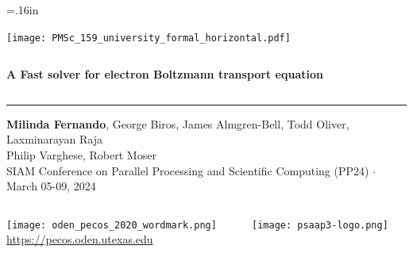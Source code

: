 \documentclass[mathserif, aspectratio=169]{beamer}
\begin{document}


\hoffset=.16in

\begin{frame}[plain,t]{}
\makeatletter
\texttt{[image: PMSc\_159\_university\_formal\_horizontal.pdf]} \newline
\begin{columns}[T,onlytextwidth]
{\bf \color{burntorange} \selectfont 
A Fast solver for electron Boltzmann transport equation
}
\end{columns}
\vspace*{.15cm}
\rule{.8\textwidth}{0.6pt} \newline

\vspace*{0.05cm}
{\selectfont
  { \scriptsize
    \textbf{Milinda Fernando}, George Biros, James Almgren-Bell, Todd Oliver, Laxminarayan Raja\\ Philip Varghese, Robert Moser \\%
  }
  {\color{burntorange} \tiny
    SIAM Conference on Parallel Processing and Scientific Computing (PP24) $\cdot$ March 05-09, 2024
  }
}

\vspace*{1cm}
\begin{columns}
\begin{column}{0.8\linewidth}
\texttt{[image: oden\_pecos\_2020\_wordmark.png]}\\
{\scriptsize \url{https://pecos.oden.utexas.edu}}
\end{column}

\begin{column}{0.2\linewidth}
\texttt{[image: psaap3-logo.png]}
\end{column}
\end{columns}

\end{frame}
\hoffset=0in
\end{document}
